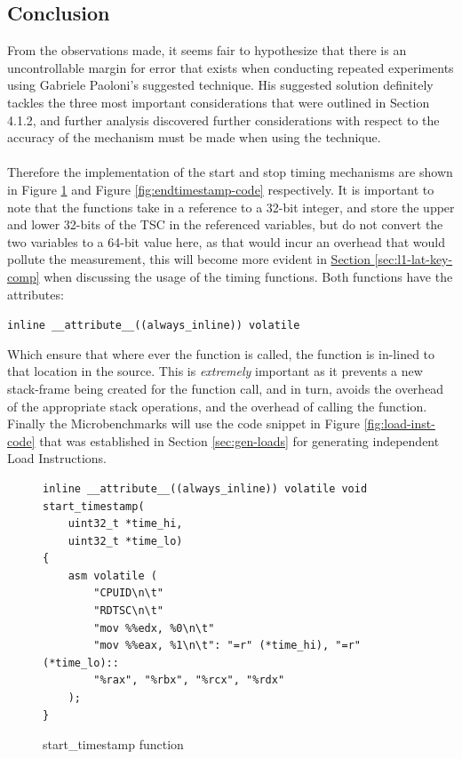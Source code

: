 \documentclass[bsc,frontabs,twoside,singlespacing,parskip,deptreport]{infthesis}     %
\begin{document}

\subsection{Conclusion}
From the observations made, it seems fair to hypothesize that there is an uncontrollable margin for error that exists when conducting repeated experiments using Gabriele Paoloni's suggested technique\cite{code_exec_times}. His suggested solution definitely tackles the three most important considerations that were outlined in Section 4.1.2, and further analysis discovered further considerations with respect to the accuracy of the mechanism must be made when using the technique. \\
\\
Therefore the implementation of the start and stop timing mechanisms are shown in Figure \ref{fig:starttimestamp-code} and Figure \ref{fig:endtimestamp-code} respectively. It is important to note that the functions take in a reference to a 32-bit integer, and store the upper and lower 32-bits of the TSC in the referenced variables, but do not convert the two variables to a 64-bit value here, as that would incur an overhead that would pollute the measurement, this will become more evident in \hyperref[sec:l1-lat-key-comp]{Section \ref{sec:l1-lat-key-comp}} when discussing the usage of the timing functions. Both functions have the attributes:
    
    \begin{center}
        \texttt{inline \_\_attribute\_\_((always\_inline)) volatile}
    \end{center}
Which ensure that where ever the function is called, the function is in-lined to that location in the source. This is \emph{extremely} important as it prevents a new stack-frame being created for the function call, and in turn, avoids the overhead of the appropriate stack operations, and the overhead of calling the function. Finally the Microbenchmarks will use the code snippet in Figure \ref{fig:load-inst-code} that was established in Section \ref{sec:gen-loads} for generating independent Load Instructions.

\begin{figure}[h!]
    \centering
    \begin{verbatim}
inline __attribute__((always_inline)) volatile void start_timestamp(
    uint32_t *time_hi,
    uint32_t *time_lo)
{
    asm volatile (
        "CPUID\n\t"
        "RDTSC\n\t"
        "mov %%edx, %0\n\t"
        "mov %%eax, %1\n\t": "=r" (*time_hi), "=r" (*time_lo)::
        "%rax", "%rbx", "%rcx", "%rdx"
    );
}
    \end{verbatim}
    \caption{start\_timestamp function}
    \label{fig:starttimestamp-code}
\end{figure}
\end{document}

